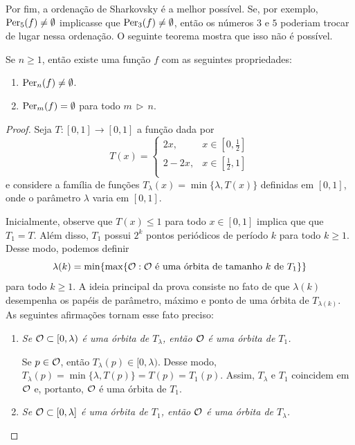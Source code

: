 Por fim, a ordenação de Sharkovsky é a melhor possível. Se, por exemplo, $\operatorname{Per}_5(f) \neq \emptyset$ implicasse que $\operatorname{Per}_3(f) \neq \emptyset$, então os números $3$ e $5$ poderiam trocar de lugar nessa ordenação. O seguinte teorema mostra que isso não é possível.

\begin{theorem}
Se $n \geq 1$, então existe uma função $f$ com as seguintes propriedades:
\begin{enumerate}
\item $\operatorname{Per}_n(f) \neq \emptyset$.
\item $\operatorname{Per}_m(f) =  \emptyset$ para todo $m \, \triangleright \, n$.
\end{enumerate}
\end{theorem}

\begin{proof}
Seja $T: [0,1] \to [0,1]$ a função dada por
\[ T(x) =
  \begin{cases}
    2x, & x \in \left[ 0, \frac{1}{2} \right] \\
    2 - 2x, & x \in \left[ \frac{1}{2}, 1 \right] \\
  \end{cases}
\]
e considere a família de funções $T_\lambda(x) = \min \lbrace \lambda, T(x) \rbrace$ definidas em $[0,1]$, onde o parâmetro $\lambda$ varia em $[0,1]$.

Inicialmente, observe que $T(x) \leq 1$ para todo $x \in [0,1]$ implica que que $T_1 = T$.
Além disso, $T_1$ possui $2^k$ pontos periódicos de período $k$ para todo $k \geq 1$.
Desse modo, podemos definir
$$\lambda(k) = \min \lbrace \max \lbrace \mathcal{O} : \mathcal{O} \text{ é uma órbita de tamanho } k \text{ de } T_1 \rbrace \rbrace$$
para todo $k \geq 1$.
A ideia principal da prova consiste no fato de que $\lambda(k)$ desempenha os papéis de parâmetro, máximo e ponto de uma órbita de $T_{\lambda(k)}$. As seguintes afirmações tornam esse fato preciso:

\begin{enumerate}[label=\alph*)]
\item \textit{Se $\mathcal{O} \subset [0, \lambda)$ é uma órbita de $T_\lambda$, então $\mathcal{O}$ é uma órbita de $T_1$.}

Se $p \in \mathcal{O}$, então $T_\lambda(p) \in [0, \lambda)$.
Desse modo, $T_\lambda(p) = \min \lbrace \lambda, T(p) \rbrace = T(p) = T_1(p)$.
Assim, $T_\lambda$ e $T_1$ coincidem em $\mathcal{O}$ e, portanto, $\mathcal{O}$ é uma órbita de $T_1$.

\item \textit{Se $\mathcal{O} \subset [0, \lambda]$ é uma órbita de $T_1$, então $\mathcal{O}$ é uma órbita de $T_\lambda$.}


\end{enumerate}
\end{proof}
